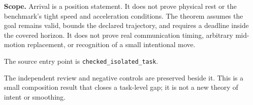 \textbf{Scope.} Arrival is a position statement. It does not prove physical rest
or the benchmark's tight speed and acceleration conditions. The theorem assumes
the goal remains valid, bounds the declared trajectory, and requires a deadline
inside the covered horizon. It does not prove real communication timing,
arbitrary mid-motion replacement, or recognition of a small intentional move.

The source entry point is \texttt{checked\_isolated\_task}.
\par{}
The independent review and
negative controls are preserved beside it. This is a small composition result
that closes a task-level gap; it is not a new theory of intent or smoothing.
